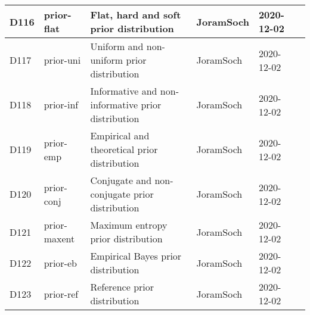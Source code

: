 \documentclass[a4paper,12pt,twoside]{book}
\begin{document}
\begin{longtable}{|p{1cm}|p{2cm}|p{6.5cm}|p{3cm}|p{2cm}|c|}
D116 & prior-flat & Flat, hard and soft prior distribution & JoramSoch & 2020-12-02 & \pageref{sec:prior-flat} \\ \hline
D117 & prior-uni & Uniform and non-uniform prior distribution & JoramSoch & 2020-12-02 & \pageref{sec:prior-uni} \\ \hline
D118 & prior-inf & Informative and non-informative prior distribution & JoramSoch & 2020-12-02 & \pageref{sec:prior-inf} \\ \hline
D119 & prior-emp & Empirical and theoretical prior distribution & JoramSoch & 2020-12-02 & \pageref{sec:prior-emp} \\ \hline
D120 & prior-conj & Conjugate and non-conjugate prior distribution & JoramSoch & 2020-12-02 & \pageref{sec:prior-conj} \\ \hline
D121 & prior-maxent & Maximum entropy prior distribution & JoramSoch & 2020-12-02 & \pageref{sec:prior-maxent} \\ \hline
D122 & prior-eb & Empirical Bayes prior distribution & JoramSoch & 2020-12-02 & \pageref{sec:prior-eb} \\ \hline
D123 & prior-ref & Reference prior distribution & JoramSoch & 2020-12-02 & \pageref{sec:prior-ref} \\ \hline
\end{longtable}
\end{document}

